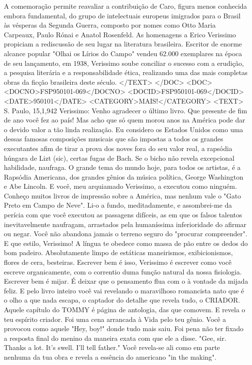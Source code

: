 A comemoração permite reavaliar a contribuição de Caro, figura menos conhecida embora fundamental, do grupo de intelectuais europeus imigrados para o Brasil às vésperas da Segunda Guerra, composto por nomes como Otto Maria Carpeaux, Paulo Rónai e Anatol Rosenfeld.
As homenagens a Erico Verissimo propiciam a rediscussão de seu lugar na literatura brasileira. Escritor de enorme alcance popular "Olhai os Lírios do Campo" vendeu 62.000 exemplares na época de seu lançamento, em 1938, Verissimo soube conciliar o sucesso com a erudição, a pesquisa literária e a responsabilidade ética, realizando uma das mais completas obras da ficção brasileira deste século.
</TEXT>
</DOC>
<DOC>
<DOCNO>FSP950101-069</DOCNO>
<DOCID>FSP950101-069</DOCID>
<DATE>950101</DATE>
<CATEGORY>MAIS!</CATEGORY>
<TEXT>
S. Paulo, 15,1,942
Verissimo:
Venho agradecer o último livro. Que presente de fim de ano você fez ao país! Mas acho que só quem morou anos na América pode dar o devido valor a tão linda realização. Eu considero os Estados Unidos como uma dessas famosas composições musicais que são impostas a todos os grandes executantes afim de tirar a prova dos noves fora do seu valor real, a rapsódia húngara de Lizt (sic), certas fugas de Bach. Se o bicho não revela excepcional habilidade, naufraga. O grande tema do mundo hoje, para todos os artistas, é a Rapsódia Americana, dos grandes gênios da música política, George Washington e Abe Lincoln. E você, meu arquiamado Verissimo, a executou como ninguém.
Conheço muitos livros de impressão sobre a América, mas nenhum vale o "Gato Preto em Campo de Neve". Li-o a fundo, meditadamente, e assombrei-me da perícia com que você executou as passagens difíceis, as em que os falsos talentos inevitavelmente naufragam, arrastados pela humaníssima inferioridade do afirmar ou negar. Você não abandona jamais o terreno seguro do "procurar compreender".
E que estilo, Verissimo! A língua te obedece como massa de pão entre os dedos do bom padeiro. Absolutamente limpo de estáticas maneirismos, exibicionismos, flores de cera, besteiras. Escrever bem é isso, Verissimo é escrever como você escreve organicamente, com o correntio duma função natural da nossa fisiologia. Escrever bem é mijar. É deixar que o pensamento flua com o à vontade da mijada feliz.
E pelo livro inteiro você vai revelando o maravilhoso romancista nato que é o olho a que nada escapa, o captador do detalhe que revela tudo, o CRIADOR. Aquele capítulo do TOMMY é página de antologia, das que comovem. E revela o teu espírito criador. Foi uma cena arrancada à Vida pelo teu gênio. Você a provocou como aquele "Hey, boy!" donde tudo mais saiu. Foi pena não ter fixado a resposta final do menino da maneira exata com que ele a disse. "Gee, sir. Thanks a lot. It's swell. I'll tell father." Você revela-se ali como em parte nenhuma da tua obra e revela a essência do americano "in the making".
